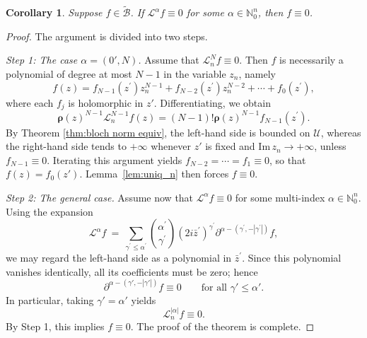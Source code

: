 \documentclass{amsart}
\newtheorem{corollary}[theorem]{Corollary}
\numberwithin{equation}{section}
\newcommand{\ImPt}{\mathrm{Im}\,}
\newcommand{\bfL}{\mathcal{L}}
\newcommand{\calU}{\mathcal{U}}
\newcommand{\bfrho}{\boldsymbol{\rho}}
\newcommand{\calB}{\mathcal{B}}
\newcommand{\bbN}{\mathbb{N}}
\begin{document}
\begin{corollary}\label{thm:uniquess}
Suppose $f\in\widetilde{\calB}$. If $\bfL^{\alpha} f\equiv 0$ for some $\alpha\in \mathbb{N}_0^n$, then $f\equiv 0$.
\end{corollary}

\begin{proof}
The argument is divided into two steps.

\medskip
\noindent\textit{Step 1: The case $\alpha=(0',N)$.}
Assume that $\bfL_n^N f\equiv0$. Then $f$ is necessarily a polynomial of degree at most $N-1$ in the variable $z_n$, namely
\[
f(z)=f_{N-1}(z^{\prime}) z_n^{N-1}+f_{N-2}(z^{\prime}) z_n^{N-2}+\cdots+ f_0(z^{\prime}),
\]
where each $f_j$ is holomorphic in $z'$. 
Differentiating, we obtain
\[
\bfrho(z)^{N-1}\bfL_n^{N-1} f(z) = (N-1)! \bfrho(z)^{N-1} f_{N-1}(z^{\prime}).
\]
By Theorem \ref{thm:bloch norm equiv}, the left-hand side is bounded on $\calU$, whereas the right-hand side tends to $+\infty$ whenever $z'$ is fixed and $\ImPt z_n\to+\infty$, unless $f_{N-1}\equiv0$. 
Iterating this argument yields $f_{N-2}=\cdots=f_1\equiv0$, so that $f(z)=f_0(z')$.  
Lemma~\ref{lem:uniq_n} then forces $f\equiv0$.


\medskip
\noindent\textit{Step 2: The general case.}
Assume now that $\bfL^\alpha f\equiv0$ for some multi-index $\alpha\in\bbN_0^n$.  
Using the expansion
\[
\bfL^{\alpha} f ~=~ \sum_{\gamma^{\prime} \leq \alpha^{\prime}} \binom{\alpha^{\prime}}{\gamma^{\prime}}
(2i\bar{z}^{\prime})^{\gamma^{\prime}}
\partial^{\alpha-(\gamma^{\prime}, -|\gamma^{\prime}|)}f,
\]
we may regard the left-hand side as a polynomial in $\bar{z}^{\prime}$. 
Since this polynomial vanishes identically, all its coefficients must be zero; hence
\[
\partial^{\alpha - (\gamma', -|\gamma'|)} f \equiv 0
\qquad\text{for all }\gamma'\le \alpha'.
\]
In particular, taking $\gamma'=\alpha'$ yields
\[
\bfL_n^{|\alpha|} f \equiv 0.
\]
By Step 1, this implies $f\equiv0$.  
The proof of the theorem is complete.
\end{proof}
\end{document}
